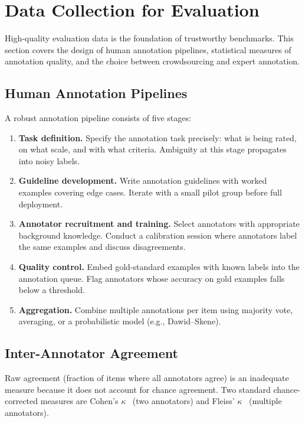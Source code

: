 \section{Data Collection for Evaluation}
\label{subsec:data-collection}

High-quality evaluation data is the foundation of trustworthy benchmarks. This section covers the design of human annotation pipelines, statistical measures of annotation quality, and the choice between crowdsourcing and expert annotation.

\subsection{Human Annotation Pipelines}
\label{human-annotation-pipelines}

A robust annotation pipeline consists of five stages:

\begin{enumerate}
  \item \textbf{Task definition.} Specify the annotation task precisely: what is being rated, on what scale, and with what criteria. Ambiguity at this stage propagates into noisy labels.
  \item \textbf{Guideline development.} Write annotation guidelines with worked examples covering edge cases. Iterate with a small pilot group before full deployment.
  \item \textbf{Annotator recruitment and training.} Select annotators with appropriate background knowledge. Conduct a calibration session where annotators label the same examples and discuss disagreements.
  \item \textbf{Quality control.} Embed gold-standard examples with known labels into the annotation queue. Flag annotators whose accuracy on gold examples falls below a threshold.
  \item \textbf{Aggregation.} Combine multiple annotations per item using majority vote, averaging, or a probabilistic model (e.g., Dawid--Skene).
\end{enumerate}

\subsection{Inter-Annotator Agreement}
\label{inter-annotator-agreement}

Raw agreement (fraction of items where all annotators agree) is an inadequate measure because it does not account for chance agreement. Two standard chance-corrected measures are Cohen’s $\kappa$~\cite{cohen1960coefficient} (two annotators) and Fleiss’ $\kappa$~\cite{fleiss1971measuring} (multiple annotators).

